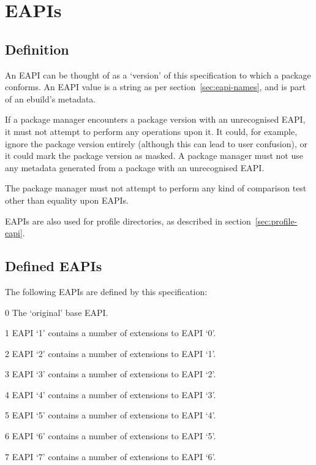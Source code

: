 \chapter{EAPIs}

\section{Definition}

An EAPI can be thought of as a `version' of this specification to which a package conforms. An EAPI
value is a string as per section~\ref{sec:eapi-names}, and is part of an ebuild's metadata.

If a package manager encounters a package version with an unrecognised EAPI, it must not attempt to
perform any operations upon it. It could, for example, ignore the package version entirely (although
this can lead to user confusion), or it could mark the package version as masked. A package manager
must not use any metadata generated from a package with an unrecognised EAPI.

The package manager must not attempt to perform any kind of comparison test other than equality upon
EAPIs.

EAPIs are also used for profile directories, as described in section~\ref{sec:profile-eapi}.

\section{Defined EAPIs}

The following EAPIs are defined by this specification:

\begin{compactdesc}
\item[0] The `original' base EAPI.
\item[1] EAPI `1' contains a number of extensions to EAPI `0'.
\item[2] EAPI `2' contains a number of extensions to EAPI `1'.
\item[3] EAPI `3' contains a number of extensions to EAPI `2'.
\item[4] EAPI `4' contains a number of extensions to EAPI `3'.
\item[5] EAPI `5' contains a number of extensions to EAPI `4'.
\item[6] EAPI `6' contains a number of extensions to EAPI `5'.
\item[7] EAPI `7' contains a number of extensions to EAPI `6'.
\end{compactdesc}

